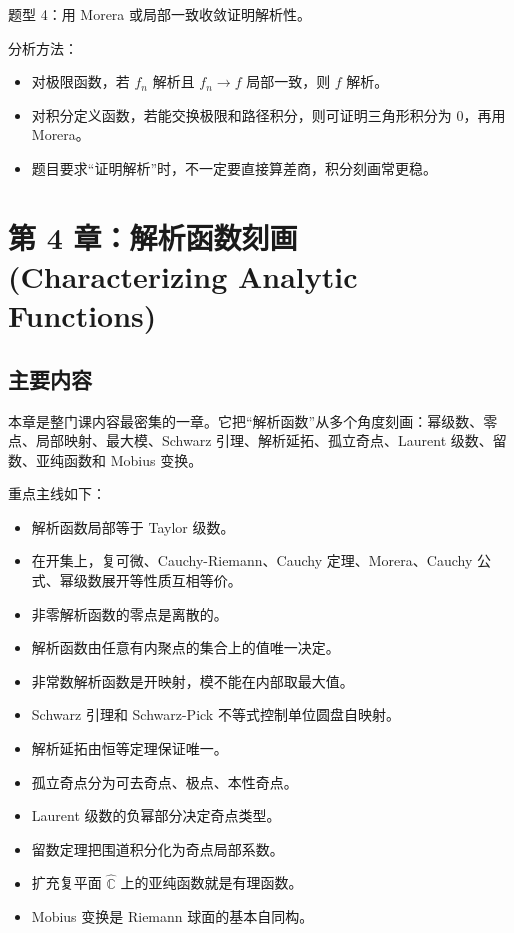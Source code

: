 \documentclass{article}
\begin{document}
题型 4：用 Morera 或局部一致收敛证明解析性。

分析方法：

\begin{itemize}
\item
  对极限函数，若 $f_n$ 解析且 $f_n\to f$
  局部一致，则 $f$ 解析。
\item
  对积分定义函数，若能交换极限和路径积分，则可证明三角形积分为
  $0$，再用 Morera。
\item
  题目要求``证明解析''时，不一定要直接算差商，积分刻画常更稳。
\end{itemize}

\section{第 4 章：解析函数刻画 (Characterizing Analytic Functions)}

\subsection{主要内容}

本章是整门课内容最密集的一章。它把``解析函数''从多个角度刻画：幂级数、零点、局部映射、最大模、Schwarz
引理、解析延拓、孤立奇点、Laurent 级数、留数、亚纯函数和 Mobius 变换。

重点主线如下：

\begin{itemize}
\item
  解析函数局部等于 Taylor 级数。
\item
  在开集上，复可微、Cauchy-Riemann、Cauchy 定理、Morera、Cauchy
  公式、幂级数展开等性质互相等价。
\item
  非零解析函数的零点是离散的。
\item
  解析函数由任意有内聚点的集合上的值唯一决定。
\item
  非常数解析函数是开映射，模不能在内部取最大值。
\item
  Schwarz 引理和 Schwarz-Pick 不等式控制单位圆盘自映射。
\item
  解析延拓由恒等定理保证唯一。
\item
  孤立奇点分为可去奇点、极点、本性奇点。
\item
  Laurent 级数的负幂部分决定奇点类型。
\item
  留数定理把围道积分化为奇点局部系数。
\item
  扩充复平面 \(\widehat{\mathbb C}\)
  上的亚纯函数就是有理函数。
\item
  Mobius 变换是 Riemann 球面的基本自同构。
\end{itemize}
\end{document}

